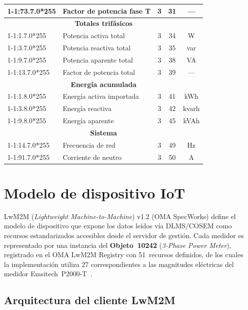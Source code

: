 \begin{table}[H]
{\begin{tabular}{|l|l|c|c|c|}
1-1:73.7.0*255 & Factor de potencia fase T & 3 & 31 & --- \\
\hline
\multicolumn{5}{|c|}{\cellcolor{gray!10}\textbf{Totales trifásicos}} \\
\hline
1-1:1.7.0*255 & Potencia activa total & 3 & 34 & W \\
\hline
1-1:3.7.0*255 & Potencia reactiva total & 3 & 35 & var \\
\hline
1-1:9.7.0*255 & Potencia aparente total & 3 & 38 & VA \\
\hline
1-1:13.7.0*255 & Factor de potencia total & 3 & 39 & --- \\
\hline
\multicolumn{5}{|c|}{\cellcolor{gray!10}\textbf{Energía acumulada}} \\
\hline
1-1:1.8.0*255 & Energía activa importada & 3 & 41 & kWh \\
\hline
1-1:3.8.0*255 & Energía reactiva & 3 & 42 & kvarh \\
\hline
1-1:9.8.0*255 & Energía aparente & 3 & 45 & kVAh \\
\hline
\multicolumn{5}{|c|}{\cellcolor{gray!10}\textbf{Sistema}} \\
\hline
1-1:14.7.0*255 & Frecuencia de red & 3 & 49 & Hz \\
\hline
1-1:91.7.0*255 & Corriente de neutro & 3 & 50 & A \\
\hline
\end{tabular}}%
\end{table}


\section{Modelo de dispositivo IoT}
\label{sec:nodo-lwm2m}

LwM2M (\emph{Lightweight Machine-to-Machine}) v1.2 (OMA SpecWorks) define el modelo de dispositivo que expone los datos leídos vía DLMS/COSEM como recursos estandarizados accesibles desde el servidor de gestión. Cada medidor es representado por una instancia del \textbf{Objeto~10242} (\emph{3-Phase Power Meter}), registrado en el OMA LwM2M Registry con 51~recursos definidos, de los cuales la implementación utiliza 27 correspondientes a las magnitudes eléctricas del medidor Emsitech~P2000-T~\cite{OMA_LwM2M2020, haEnablingDynamicLightweight2018, karaagacLightweightM2MSurvey2018}.

\subsection{Arquitectura del cliente LwM2M}
\label{sec:nodo-lwm2m-arquitectura}


